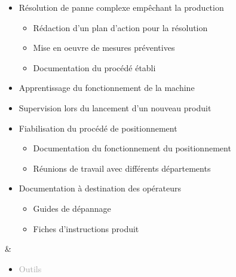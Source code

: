 \documentclass{article}
\begin{document}
\begin{tabular}
\begin{itemize}
\begin{itemize}
            \item \textcolor{gray!80}{Résolution de panne complexe empêchant la production}
            \begin{itemize}
                [label={\textcolor{gray!80}{$\triangleright$}}, topsep=0pt, partopsep=0pt, itemsep=0.5pt, parsep=2pt]
                \item \textcolor{gray!80}{Rédaction d'un plan d'action pour la résolution}
                \item \textcolor{gray!80}{Mise en oeuvre de mesures préventives}
                \item \textcolor{gray!80}{Documentation du procédé établi}
            \end{itemize}
            \item \textcolor{gray!80}{Apprentissage du fonctionnement de la machine}
            \item \textcolor{gray!80}{Supervision lors du lancement d'un nouveau produit}
            \item \textcolor{gray!80}{Fiabilisation du procédé de positionnement}
            \begin{itemize}
                [label={\textcolor{gray!80}{$\triangleright$}}, topsep=0pt, partopsep=0pt, itemsep=0.5pt, parsep=2pt]
                \item \textcolor{gray!80}{Documentation du fonctionnement du positionnement}
                \item \textcolor{gray!80}{Réunions de travail avec différents départements}
            \end{itemize}
            \item \textcolor{gray!80}{Documentation à destination des opérateurs}
            \begin{itemize}
            [label={\textcolor{gray!80}{$\triangleright$}}, topsep=0pt, partopsep=0pt, itemsep=0.5pt, parsep=2pt]
                \item \textcolor{gray!80}{Guides de dépannage}
                \item \textcolor{gray!80}{Fiches d'instructions produit}
            \end{itemize}
        \end{itemize}
    \end{itemize}
    &
    \begin{itemize}
        [label={}, topsep=8pt, partopsep=0pt, itemsep=0.5pt, parsep=2pt,after=\vspace*{-\baselineskip}]
        \setlength{\itemsep}{10pt}
        \item \textcolor{darkGray}{Outils}

\end{itemize}
\end{tabular}
\end{document}
